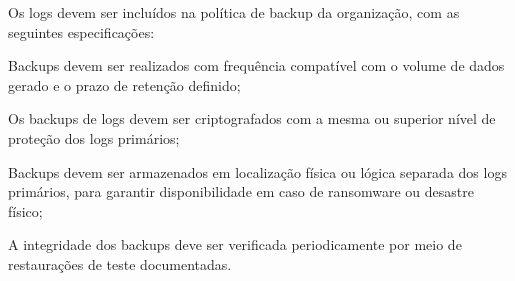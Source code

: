 Os logs devem ser incluídos na política de backup da organização, com as seguintes especificações:

\begin{alineas}
    \item Backups devem ser realizados com frequência compatível com o volume de dados gerado e o prazo de retenção definido;
    \item Os backups de logs devem ser criptografados com a mesma ou superior nível de proteção dos logs primários;
    \item Backups devem ser armazenados em localização física ou lógica separada dos logs primários, para garantir disponibilidade em caso de ransomware ou desastre físico;
    \item A integridade dos backups deve ser verificada periodicamente por meio de restaurações de teste documentadas.
\end{alineas}